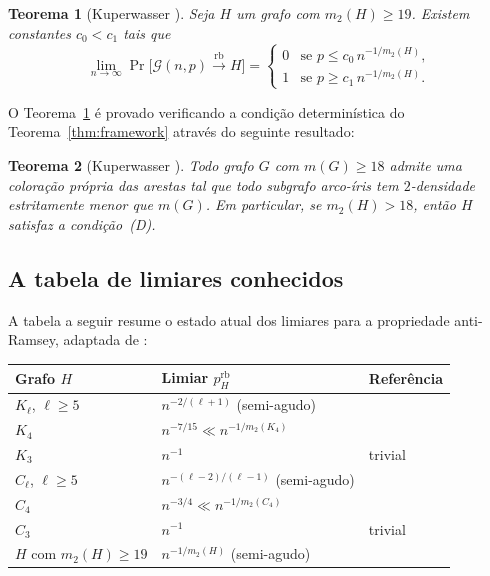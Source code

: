 \documentclass[reqno, 12pt]{amsart}
\numberwithin{equation}{section}
\theoremstyle{plain}
\newtheorem{theorem}{Teorema}[section]
\theoremstyle{definition}
\newcommand{\Gnp}{\mathcal{G}(n,p)}
\newcommand{\rb}{\xrightarrow{\,\mathrm{rb}\,}}
\newcommand{\mdens}{m_2}
\newcommand{\maxdens}{m}
\begin{document}
\begin{theorem}[Kuperwasser \cite{kuperwasser2026anti}]
    \label{thm:kuperwasser}
    Seja $H$ um grafo com $\mdens(H) \ge 19$.
    Existem constantes $c_0 < c_1$ tais que
    \[
        \lim_{n\to\infty}\Pr\!\bigl[\Gnp \rb H\bigr] =
        \begin{cases}
            0 & \text{se } p \le c_0\, n^{-1/\mdens(H)}, \\
            1 & \text{se } p \ge c_1\, n^{-1/\mdens(H)}.
        \end{cases}
    \]
\end{theorem}

O Teorema~\ref{thm:kuperwasser} é provado verificando a condição determinística
do Teorema~\ref{thm:framework} através do seguinte resultado:

\begin{theorem}[Kuperwasser \cite{kuperwasser2026anti}]
    \label{thm:kuperwasser-det}
    Todo grafo $G$ com $\maxdens(G) \ge 18$ admite uma coloração própria das arestas
    tal que todo subgrafo arco-íris tem $2$-densidade estritamente menor que $\maxdens(G)$.
    Em particular, se $\mdens(H) > 18$, então $H$ satisfaz a condição~\emph{(D)}.
\end{theorem}

\subsection{A tabela de limiares conhecidos}

A tabela a seguir resume o estado atual dos limiares para a propriedade anti-Ramsey,
adaptada de \cite{behague2025thresholds}:

\begin{center}
    \renewcommand{\arraystretch}{1.4}
    \begin{tabular}{lll}
        \hline
        \textbf{Grafo $H$}     & \textbf{Limiar $p_H^{\mathrm{rb}}$}   & \textbf{Referência}        \\
        \hline
        $K_\ell$, $\ell \ge 5$ & $n^{-2/(\ell+1)}$ (semi-agudo)        & \cite{AntiComplete}        \\
        $K_4$                  & $n^{-7/15} \ll n^{-1/m_2(K_4)}$       & \cite{AntiComplete}        \\
        $K_3$                  & $n^{-1}$                              & trivial                    \\
        $C_\ell$, $\ell \ge 5$ & $n^{-(\ell-2)/(\ell-1)}$ (semi-agudo) & \cite{AntiCycles}          \\
        $C_4$                  & $n^{-3/4} \ll n^{-1/m_2(C_4)}$        & \cite{AntiCycles}          \\
        $C_3$                  & $n^{-1}$                              & trivial                    \\
        $H$ com $m_2(H)\ge 19$ & $n^{-1/m_2(H)}$ (semi-agudo)          & \cite{kuperwasser2026anti} \\
        \hline
    \end{tabular}
\end{center}
\end{document}
